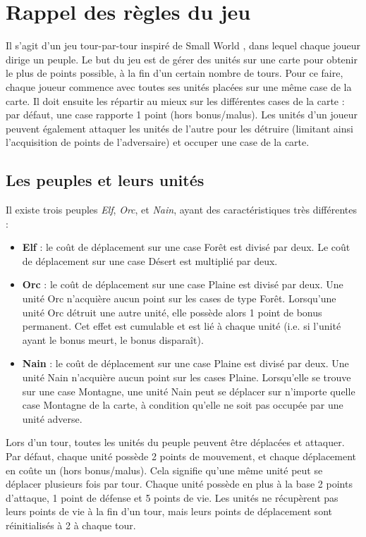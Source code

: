 \section{Rappel des règles du jeu}

Il s’agit d’un jeu tour-par-tour inspiré de \og Small World \fg{}, dans lequel chaque joueur dirige un peuple. Le but du jeu est de gérer des unités sur une carte pour obtenir le plus de points possible, à la fin d’un certain nombre de tours. Pour ce faire, chaque joueur commence avec toutes ses unités placées sur une même case de la carte. Il doit ensuite les répartir au mieux sur les différentes cases de la carte : par défaut, une case rapporte 1 point (hors bonus/malus). Les unités d’un joueur peuvent également attaquer les unités de l'autre pour les détruire (limitant ainsi l’acquisition de points de l’adversaire) et occuper une case de la carte. 

\subsection{Les peuples et leurs unités}

Il existe trois peuples \textit{Elf}, \textit{Orc}, et \textit{Nain}, ayant des caractéristiques très différentes :

\begin{itemize}

\item \textbf{Elf} :  le coût de déplacement sur une case Forêt est divisé par deux. Le coût de déplacement sur une case Désert est multiplié par deux.
\item \textbf{Orc} : le coût de déplacement sur une case Plaine est divisé par deux. Une unité Orc n’acquière aucun point sur les cases de type Forêt. Lorsqu’une unité Orc détruit une autre unité, elle possède alors 1 point de bonus permanent. Cet effet est cumulable et est lié à chaque unité (i.e. si l’unité ayant le bonus meurt, le bonus disparaît).
\item \textbf{Nain} :  le coût de déplacement sur une case Plaine est divisé par deux. Une unité Nain n’acquière aucun point sur les cases Plaine. Lorsqu’elle se trouve sur une case Montagne, une unité Nain peut se déplacer sur n’importe quelle case Montagne de la carte, à condition qu’elle ne soit pas occupée par une unité adverse.

\end{itemize}

Lors d'un tour, toutes les unités du peuple peuvent être déplacées et attaquer. Par défaut, chaque unité possède 2 points de mouvement, et chaque déplacement en coûte un (hors bonus/malus). Cela signifie qu’une même unité peut se déplacer plusieurs fois par tour. Chaque unité possède en plus à la base 2 points d’attaque, 1 point de défense et 5 points de vie. Les unités ne récupèrent pas leurs points de vie à la fin d’un tour, mais leurs points de déplacement sont réinitialisés à 2 à chaque tour.

